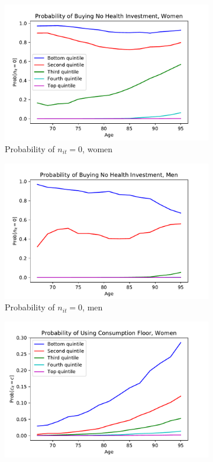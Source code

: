 \documentclass[12pt,pdftex,letterpaper]{article}
\newcommand{\Invst}{n}
\begin{document}
\begin{figure}[h!]
    \centering
    \begin{subfigure}[b]{0.49\textwidth}
        \centering
        \includegraphics[width=\textwidth]{../Figures/ZeroInvstWomen.pdf}
        \caption{Probability of $\Invst_{it}=0$, women}
    \end{subfigure}
    \begin{subfigure}[b]{0.49\textwidth}
        \centering
        \includegraphics[width=\textwidth]{../Figures/ZeroInvstMen.pdf}
        \caption{Probability of $\Invst_{it}=0$, men}
    \end{subfigure}
    \begin{subfigure}[b]{0.49\textwidth}
        \centering
        \includegraphics[width=\textwidth]{../Figures/cFloorWomen.pdf}

\end{subfigure}
\end{figure}
\end{document}
